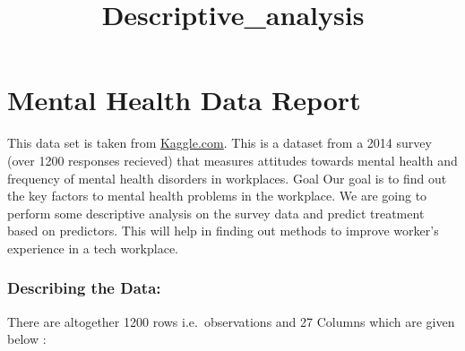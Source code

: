 \documentclass[11pt]{article}
\title{Descriptive\_analysis}
\begin{document}
    
    
    \maketitle
    
    

    
    \hypertarget{mental-health-data-report}{%
\section{Mental Health Data Report}\label{mental-health-data-report}}

This data set is taken from
\href{https://www.kaggle.com/osmi/mental-health-in-tech-survey}{Kaggle.com}.
This is a dataset from a 2014 survey (over 1200 responses recieved) that
measures attitudes towards mental health and frequency of mental health
disorders in workplaces. Goal Our goal is to find out the key factors to
mental health problems in the workplace. We are going to perform some
descriptive analysis on the survey data and predict treatment based on
predictors. This will help in finding out methods to improve worker's
experience in a tech workplace.

\hypertarget{describing-the-data}{%
\subsubsection{Describing the Data:}\label{describing-the-data}}

There are altogether 1200 rows i.e.~observations and 27 Columns which
are given below :
\end{document}
